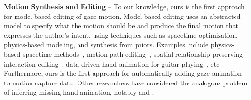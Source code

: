 \noindent\textbf{Motion Synthesis and Editing} -- To our knowledge, ours is the first approach for model-based editing of gaze motion. Model-based editing uses an abstracted model to specify what the motion should be and produce the final motion that expresses the author's intent, using techniques such as spacetime optimization, physics-based modeling, and synthesis from priors. Examples include physics-based spacetime methods~\cite{popovic99physically}, motion path editing~\cite{gleicher2001path}, spatial relationship preserving interaction editing~\cite{ho2010spatial}, data-driven hand animation for guitar playing~\cite{elkoura2003handrix}, etc. Furthermore, ours is the first approach for automatically adding gaze animation to motion capture data. Other researchers have considered the analogous problem of inferring missing hand animation, notably \cite{jorg2012finger} and \cite{ye2012hand}.


